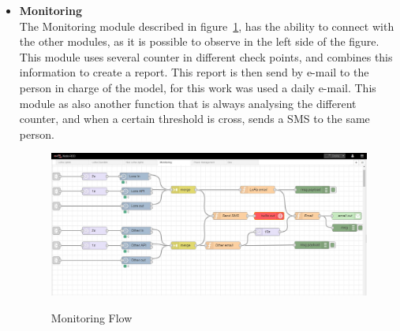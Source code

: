 \begin{itemize}
   \item \textbf{Monitoring} \\
   The Monitoring module described in figure~\ref{fig:Monitoring}, has the ability to connect with the other modules, as it is possible to observe in the left side of the figure. This module uses several counter in different check points, and combines this information to create a report. This report is then send by e-mail to the person in charge of the model, for this work was used a daily e-mail. This module as also another function that is always analysing the different counter, and when a certain threshold is cross, sends a SMS to the same person.
 
  \begin{figure}[htbp]
  \centering
  
    {\includegraphics[width=\linewidth]{Chapters/Figures/Monitoring.JPG}}
 
  \caption{Monitoring Flow}
  \label{fig:Monitoring}
\end{figure}

\end{itemize}

